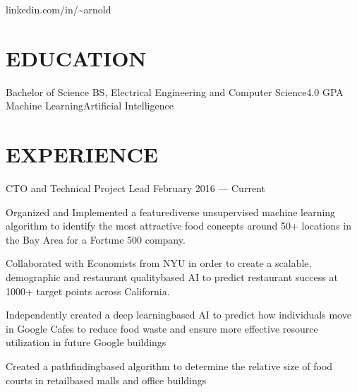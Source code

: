 \documentclass[10pt]{article}
\begin{document}
				 {linkedin.com/in/{\textasciitilde}arnold}      

\section*{EDUCATION}

        {Bachelor of Science {\textendash} BS, Electrical Engineering and Computer Science}{4.0 GPA}
			{Machine Learning}{Artificial Intelligence}


\section*{EXPERIENCE}

								{CTO and Technical Project Lead}
								{February 2016 --- Current}                  		
	                   \begin{accomplishments} 
                       \item Organized and Implemented a feature{\textendash}diverse unsupervised machine learning algorithm to identify the most attractive food concepts around 50+ locations in the Bay Area for a Fortune 500 company.
                       \item Collaborated with Economists from NYU in order to create a scalable, demographic and restaurant quality{\textendash}based AI to predict restaurant success at 1000+ target points across California.
                       \item Independently created a deep learning{\textendash}based AI to predict how individuals move in Google Cafes to reduce food waste and ensure more effective resource utilization in future Google buildings
	                    		\item Created a pathfinding{\textendash}based algorithm to determine the relative size of food courts in retail{\textendash}based malls and office buildings
	                    \end{accomplishments}
	                    		
\end{document}
